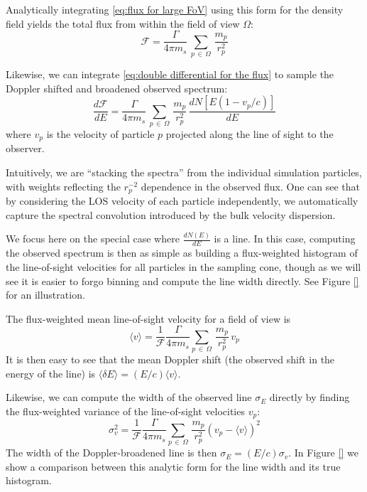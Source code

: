\documentclass[aps,prl,10pt,twocolumn,superscriptaddress,showpacs]{revtex4-1}
\begin{document}
Analytically integrating \eqref{eq:flux for large FoV} using this form for the density field yields the
total flux from within the field of view $\Omega$:
\begin{equation} 
	\mathcal{F} = \frac{\Gamma}{4\pi m_s}
	\, \sum_{p \, \in \, \Omega} \, \frac{m_p}{r_p^{2}} 
\end{equation}

Likewise, we can integrate \eqref{eq:double differential for the flux} to sample the Doppler shifted
and broadened observed spectrum:
\begin{equation} \label{eq:discrete}
	\frac{d\mathcal{F}}{dE} = \frac{\Gamma}{4 \pi m_s}\, \sum_{p \, \in \, \Omega}
	\, \frac{m_p}{r_p^{2}} \, \frac{dN[E(1-v_p/c)]}{dE}
\end{equation}
where $v_p$ is the velocity of particle $p$ projected along the line of sight to the observer.

Intuitively, we are ``stacking the spectra'' from the individual simulation
particles, with weights reflecting the $r_p^{-2}$ dependence in the observed flux. One can see that by
considering the LOS velocity of each particle independently, we automatically capture the spectral
convolution introduced by the bulk velocity dispersion. 

We focus here on the special case where
$\frac{dN(E)}{dE}$ is a line. In this case, computing the observed spectrum is then as simple as
building a flux-weighted histogram of the line-of-sight velocities for all particles in the sampling cone,
though as we will see it is easier to forgo binning and compute the line width directly. See Figure \ref{} for an
illustration.


The flux-weighted mean line-of-sight velocity for a field of view is 
\begin{equation} 
	\langle v\rangle =\frac{1}{\mathcal{F}} \frac{\Gamma}{4\pi m_s} \sum_{p \, \in \, \Omega}
	\, \frac{m_p}{r_p^{2}} \, v_p
\end{equation}
It is then easy to see that the mean Doppler shift (the observed shift in the energy of the line) is  
	$\langle \delta E\rangle = (E/c)\langle v \rangle$.

Likewise, we can compute the width of the observed line $\sigma_E$ directly by finding the flux-weighted
variance of the line-of-sight velocities $v_p$:
\begin{equation} 
	\sigma_v^2 =\frac{1}{\mathcal{F}} \frac{\Gamma}{4\pi m_s} \sum_{p \, \in \, \Omega}
	\, \frac{m_p}{r_p^{2}} \left(v_p-\langle v\rangle\right)^2 
\end{equation}
The width of the Doppler-broadened line is then $\sigma_E = (E/c) \sigma_v$. In Figure \ref{} we show a comparison 
between this analytic form for the line width and its true histogram.
\end{document}
